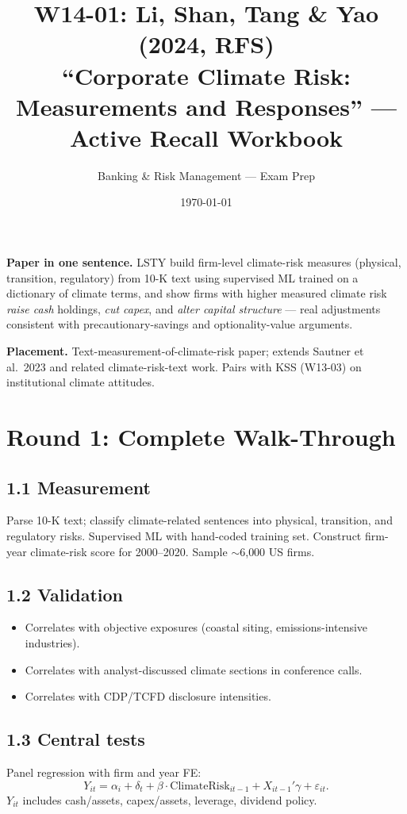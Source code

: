 \documentclass[11pt]{article}
\title{W14-01: Li, Shan, Tang \& Yao (2024, RFS) \\
\large ``Corporate Climate Risk: Measurements and Responses'' --- Active Recall Workbook}
\author{Banking \& Risk Management --- Exam Prep}
\date{\today}
\begin{document}
\maketitle

\begin{keybox}
\textbf{Paper in one sentence.} LSTY build firm-level climate-risk measures (physical, transition, regulatory) from 10-K text using supervised ML trained on a dictionary of climate terms, and show firms with higher measured climate risk \emph{raise cash} holdings, \emph{cut capex}, and \emph{alter capital structure} --- real adjustments consistent with precautionary-savings and optionality-value arguments.

\textbf{Placement.} Text-measurement-of-climate-risk paper; extends Sautner et al.\ 2023 and related climate-risk-text work. Pairs with KSS (W13-03) on institutional climate attitudes.
\end{keybox}

\section*{Round 1: Complete Walk-Through}

\subsection*{1.1 Measurement}
Parse 10-K text; classify climate-related sentences into physical, transition, and regulatory risks. Supervised ML with hand-coded training set. Construct firm-year climate-risk score for 2000--2020. Sample $\sim$6{,}000 US firms.

\subsection*{1.2 Validation}
\begin{itemize}
\item Correlates with objective exposures (coastal siting, emissions-intensive industries).
\item Correlates with analyst-discussed climate sections in conference calls.
\item Correlates with CDP/TCFD disclosure intensities.
\end{itemize}

\subsection*{1.3 Central tests}
Panel regression with firm and year FE:
\[
Y_{it}=\alpha_i+\delta_t+\beta\cdot\text{ClimateRisk}_{it-1}+X_{it-1}'\gamma+\varepsilon_{it}.
\]
$Y_{it}$ includes cash/assets, capex/assets, leverage, dividend policy.
\end{document}
